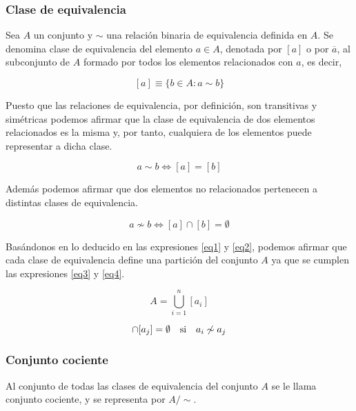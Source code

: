 \subsubsection*{Clase de equivalencia}
Sea $A$ un conjunto y $\sim$ una relación binaria de equivalencia definida en $A$. Se denomina clase de equivalencia del elemento $a\in A$, denotada por $[a]$ o por $\overline{a}$, al subconjunto de $A$ formado por todos los elementos relacionados con $a$, es decir,

$$
[a]\equiv \lbrace b \in A : a \sim b \rbrace
$$                                                                                          

Puesto que las relaciones de equivalencia, por definición, son transitivas y simétricas podemos afirmar que la clase de equivalencia de dos elementos relacionados es la misma y, por tanto, cualquiera de los elementos puede representar a dicha clase.

\begin{equation}
a\sim b \Leftrightarrow [a]=[b]
\label{eq1}
\end{equation}



Además podemos afirmar que dos elementos no relacionados pertenecen a distintas clases de equivalencia.

\begin{equation}
a \not \sim b \Leftrightarrow [a] \cap [b] = \emptyset
\label{eq2}
\end{equation}

Basándonos en lo deducido en las expresiones \ref{eq1} y \ref{eq2}, podemos afirmar que cada clase de equivalencia define una partición del conjunto $A$ ya que se cumplen las expresiones \ref{eq3} y \ref{eq4}.

\begin{equation}
A=\bigcup_{i=1}^n [a_i]
\label{eq3}
\end{equation}


\begin{equation}
[a_i]\cap [a_j]=\emptyset \quad \text{si\quad }a_i \not\sim a_j 
\label{eq4}
\end{equation}

\subsubsection*{Conjunto cociente}
Al conjunto de todas las clases de equivalencia del conjunto $A$ se le llama conjunto cociente, y se representa por $A/\sim$.

